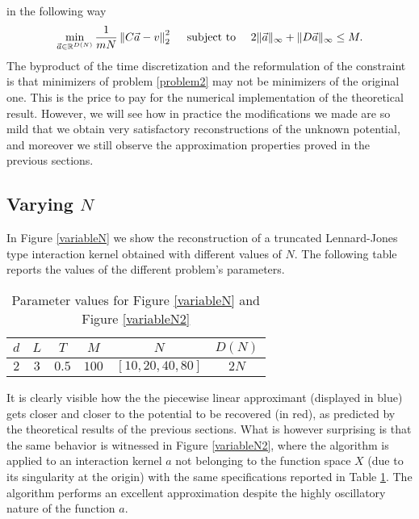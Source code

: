 in the following way
\begin{align}\label{problem2}
\min_{\vec{a} \in \mathbb{R}^{D(N)}} \frac{1}{mN} \left\| C \vec{a} - v \right\|^2_{2} \quad \text{ subject to } \quad 2\|\vec{a}\|_{\infty} + \|D\vec{a}\|_{\infty} \leq M.
\end{align}
The byproduct of the time discretization and the reformulation of the constraint is that minimizers of problem \eqref{problem2} may not be minimizers of the original one. This is the price to pay for the numerical implementation of the theoretical result. However, we will see how in practice the modifications we made are so mild that we obtain very satisfactory reconstructions of the unknown potential, and moreover we still observe the approximation properties proved in the previous sections.

\subsection{Varying $N$}

In Figure \ref{variableN} we show the reconstruction of a truncated Lennard-Jones type interaction kernel obtained with different values of $N$. The following table reports the values of the different problem's parameters.

\begin{table}[h]
\begin{center}
\begin{tabular}{ |c|c|c|c|c|c| }
\hline
  $d$ & $L$ & $T$ & $M$ & $N$ & $D(N)$ \\
\hline
\hline
  $2$ & $3$ & $0.5$ & $100$ & $[10,20,40,80]$ & $2N$ \\
\hline
\end{tabular}
\end{center}
\vspace{-0.5cm}
\caption{Parameter values for Figure \ref{variableN} and Figure \ref{variableN2}} \label{tab:fig1} 
\end{table}

It is clearly visible how the the piecewise linear approximant (displayed in blue) gets closer and closer to the potential to be recovered (in red), as predicted by the theoretical results of the previous sections. What is however surprising is that the same behavior is witnessed in Figure \ref{variableN2}, where the algorithm is applied to an interaction kernel $a$ not belonging to the function space $X$ (due to its singularity at the origin) with the same specifications reported in Table \ref{tab:fig1}. The algorithm performs an excellent approximation despite the highly oscillatory nature of the function $a$.

